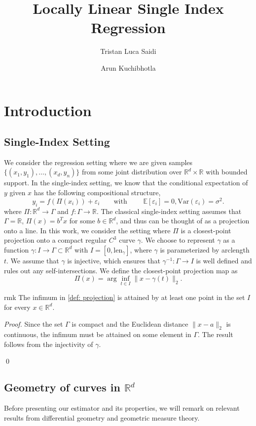 \documentclass[11pt]{article}
\title{Locally Linear Single Index Regression}
\author{Tristan Luca Saidi}
\author{Arun Kuchibhotla}
\affil[1]{Department of Statistics and Data Science, Carnegie Mellon University}
\begin{document}
\maketitle

\section{Introduction}
\subsection{Single-Index Setting}
We consider the regression setting where we are given samples $\{(x_1, y_1), \dots, (x_d, y_n)\}$ from some joint distribution over $\mathbb{R}^d\times \mathbb{R}$ with bounded support. In the single-index setting, we know that the conditional expectation of $y$ given $x$ has the following compositional structure,
\[y_i = f(\Pi(x_i)) + \varepsilon_i \qquad \text{with } \qquad \mathbb{E}[\varepsilon_i] = 0, \text{Var}(\varepsilon_i) = \sigma^2.\]
where $\Pi:\mathbb{R}^d \rightarrow \Gamma$ and $f: \Gamma\rightarrow\mathbb{R}$. The classical single-index setting assumes that $\Gamma = \mathbb{R}$, $\Pi(x) = b^{T}x$ for some $b \in \mathbb{R}^d$, and thus can be thought of as a projection onto a line. In this work, we consider the setting where $\Pi$ is a closest-point projection onto a compact regular $C^3$ curve $\gamma$. We choose to represent $\gamma$ as a function $\gamma:I \rightarrow \Gamma \subset \mathbb{R}^d$ with $I = [0,\text{len}_{\gamma}]$, where $\gamma$ is parameterized by arclength $t$. We assume that $\gamma$ is injective, which ensures that $\gamma^{-1}:\Gamma\rightarrow I$ is well defined and rules out any self-intersections. We define the closest-point projection map as
\begin{equation}\label{def: projection}
\Pi(x) = \arg\inf_{t\in I}\|x - \gamma(t)\|_2.
\end{equation}
\begin{restatable}{rmk}{} \label{remark: infimum}
    The infimum in \cref{def: projection} is attained by at least one point in the set $I$ for every $x \in \mathbb{R}^d$.
\end{restatable}
\noindent \textit{Proof.} Since the set $\Gamma$ is compact and the Euclidean distance $\|x-a\|_2$ is continuous, the infimum must be attained on some element in $\Gamma$. The result follows from the injectivity of $\gamma$. 

\qed{}

\subsection{Geometry of curves in $\mathbb{R}^d$}
Before presenting our estimator and its properties, we will remark on relevant results from differential geometry and geometric measure theory. 
\end{document}
